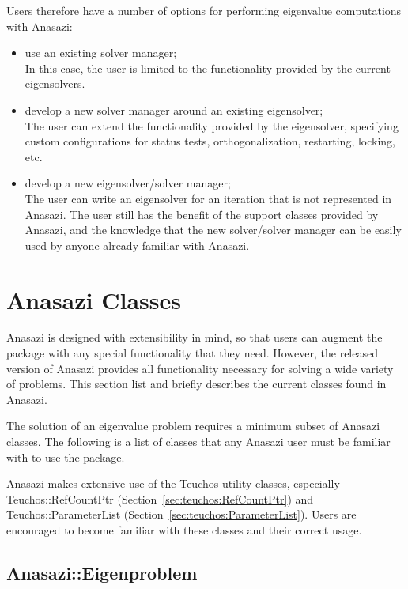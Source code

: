 Users therefore have a number of options for performing eigenvalue computations with Anasazi:
\begin{itemize}
  \item use an existing solver manager;\\
        In this case, the user is limited to the functionality provided by the current eigensolvers.
  \item develop a new solver manager around an existing eigensolver;\\
        The user can extend the functionality provided by the eigensolver, specifying 
        custom configurations for status tests, orthogonalization, restarting, locking,
        etc.
  \item develop a new eigensolver/solver manager;\\
        The user can write an eigensolver for an iteration that is not represented in
        Anasazi. The user still has the benefit of the support classes provided by 
        Anasazi, and the knowledge that the new solver/solver manager can be easily
        used by anyone already familiar with Anasazi.
\end{itemize}


\section{Anasazi Classes}
\label{sec:anasazi:classes}

Anasazi is designed with extensibility in mind, so that users can augment the package with
any special functionality that they need. However, the released version of Anasazi
provides all functionality necessary for solving a wide variety of problems. This section
list and briefly describes the current classes found in Anasazi.

The solution of an eigenvalue problem requires a minimum subset of Anasazi classes. The
following is a list of classes that any Anasazi user must be familiar with to use the
package.

\begin{remark}
Anasazi makes extensive use of the Teuchos utility classes, especially
Teuchos::RefCountPtr (Section~\ref{sec:teuchos:RefCountPtr}) and
Teuchos::ParameterList (Section~\ref{sec:teuchos:ParameterList}). Users
are encouraged to become familiar with these classes and their correct
usage.
\end{remark}

\subsection{Anasazi::Eigenproblem}
\label{sec:anasazi:eigenproblem}

